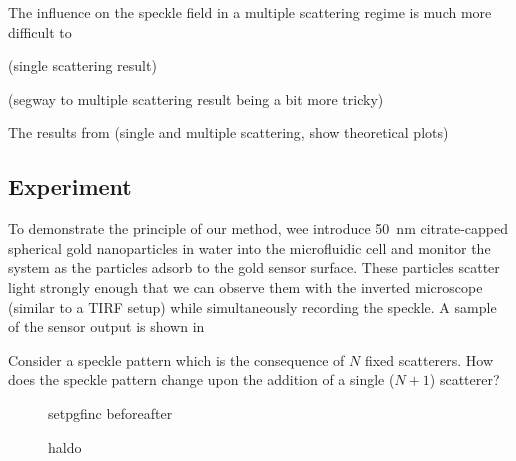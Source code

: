 The influence on the speckle field in a multiple scattering regime is much
more difficult to 

(single scattering result)

(segway to multiple scattering result being a bit more tricky)


The results from (single and multiple scattering, show theoretical plots)





\subsection{Experiment}
To demonstrate the principle of our method, wee introduce
\SI{50}{\nano\meter} citrate-capped spherical gold nanoparticles in water
into the microfluidic cell and monitor the system as the particles adsorb
to the gold sensor surface.  These particles scatter light strongly enough
that we can observe them with the inverted microscope (similar to a TIRF
setup) while simultaneously recording the speckle. 
A sample of the sensor output is shown in 

Consider a speckle pattern which is the consequence of $N$ fixed
scatterers.  How does the speckle pattern change upon the addition of a
single ($N+1$) scatterer?  

\begin{figure}
\centering
{setpgfinc}
{beforeafter}
\caption{haldo}
\label{fig:scattbeforeafter}
\end{figure}

